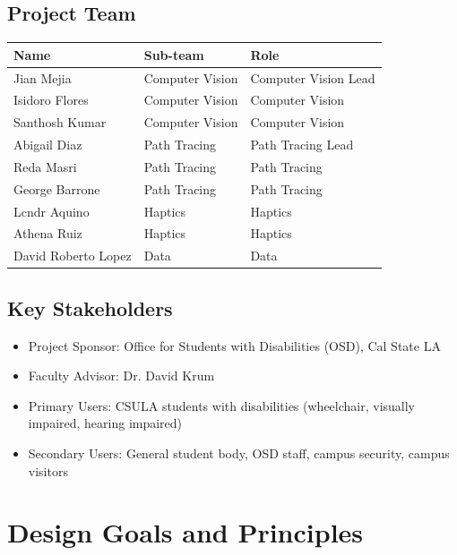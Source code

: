 \documentclass[12pt]{article}
\begin{document}
\subsection{Project Team}
\begin{tabularx}{\textwidth}{|l|l|X|}
\hline
\textbf{Name} & \textbf{Sub-team} & \textbf{Role} \\
\hline
Jian Mejia & Computer Vision & Computer Vision Lead \\
\hline
Isidoro Flores & Computer Vision & Computer Vision \\
\hline
Santhosh Kumar & Computer Vision & Computer Vision \\
\hline
Abigail Diaz & Path Tracing & Path Tracing Lead \\
\hline
Reda Masri & Path Tracing & Path Tracing \\
\hline
George Barrone & Path Tracing & Path Tracing \\
\hline
Lcndr Aquino & Haptics & Haptics \\
\hline
Athena Ruiz & Haptics & Haptics \\
\hline
David Roberto Lopez & Data & Data \\
\hline
\end{tabularx}

\subsection{Key Stakeholders}
\begin{itemize}
    \item Project Sponsor: Office for Students with Disabilities (OSD), Cal State LA
    \item Faculty Advisor: Dr. David Krum
    \item Primary Users: CSULA students with disabilities (wheelchair, visually impaired, hearing impaired)
    \item Secondary Users: General student body, OSD staff, campus security, campus visitors
\end{itemize}

\section{Design Goals and Principles}
\end{document}
